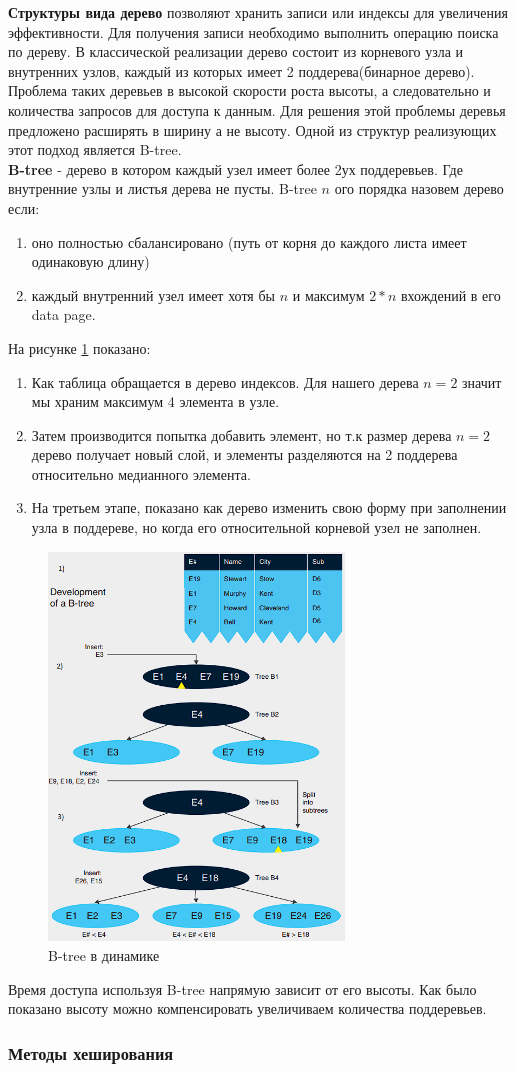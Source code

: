 \documentclass{article}
\begin{document}
\textbf{Структуры вида дерево} позволяют хранить записи или индексы для увеличения эффективности. Для получения записи необходимо выполнить операцию поиска по дереву.
В классической реализации дерево состоит из корневого узла и внутренних узлов, каждый из которых имеет 2 поддерева(бинарное дерево).
Проблема таких деревьев в высокой скорости роста высоты, а следовательно и количества запросов для доступа к данным. Для решения этой проблемы деревья предложено расширять в ширину а не высоту.
Одной из структур реализующих этот подход является B-tree.\\
\textbf{B-tree} - дерево в котором каждый узел имеет более 2ух поддеревьев. Где внутренние узлы и листья дерева не пусты.
B-tree $n$ ого порядка назовем дерево если:
\begin{enumerate}
    \item оно полностью сбалансировано (путь от корня до каждого листа имеет одинаковую длину)
    \item каждый внутренний узел имеет хотя бы $n$ и максимум $2*n$ вхождений в его data page.
\end{enumerate}
На рисунке \ref{img2} показано:
\begin{enumerate}
    \item Как таблица обращается в дерево индексов. Для нашего дерева $n = 2$ значит мы храним максимум 4 элемента в узле.
    \item Затем производится попытка добавить элемент, но т.к размер дерева $n = 2$ дерево получает новый слой, и элементы разделяются на 2 поддерева относительно медианного элемента.
    \item На третьем этапе, показано как дерево изменить свою форму при заполнении узла в поддереве, но когда его относительной корневой узел не заполнен.
\end{enumerate} 
\begin{figure}[h]
    \centering
    \includegraphics[width=0.7\textwidth]{images/btree.png}
    \caption{B-tree в динамике}
    \label{img2}
\end{figure}
\newpage
Время доступа используя B-tree напрямую зависит от его высоты. Как было показано высоту можно компенсировать увеличиваем количества поддеревьев.
\subsubsection{Методы хеширования}
\end{document}
